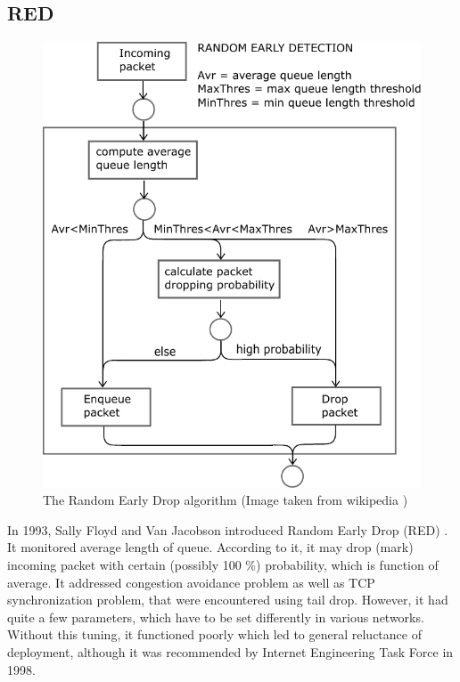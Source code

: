 \subsection{RED}


\begin{figure}
	\centering
	\includegraphics[width=137mm]{drawings/RED}
	\caption{The Random Early Drop algorithm  (Image taken from wikipedia \cite{RED:picture}) }
	
	\label{fig04:RED}
\end{figure}

In 1993, Sally Floyd and Van Jacobson introduced Random Early Drop (RED) \cite{Floyd:1993:RED:169931.169935}. It monitored average length of queue. According to it, it may drop (mark) incoming packet with certain (possibly 100 \%) probability, which is function of average. It addressed congestion avoidance problem as well as TCP synchronization problem, that were encountered using tail drop. However, it had quite a few parameters, which have to be set differently in various networks. Without this tuning, it functioned poorly which led to general reluctance of deployment, although it was recommended by Internet Engineering Task Force \cite{rfc2309} in 1998.

